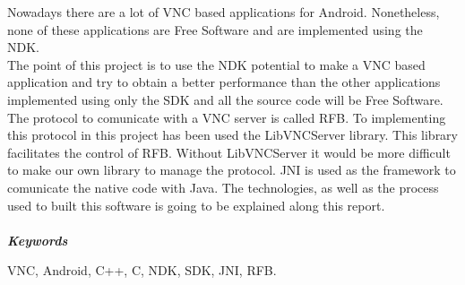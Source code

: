 
Nowadays there are a lot of VNC based applications for Android. Nonetheless, none of these applications are Free Software and are implemented using the NDK.\\

The point of this project is to use the NDK potential to make a VNC based application and try to obtain a better performance than the other applications implemented using only the SDK and all the source code will be Free Software.\\

The protocol to comunicate with a VNC server is called RFB. To implementing this protocol in this project has been used the LibVNCServer library. This library facilitates the control of RFB. Without LibVNCServer it would be more difficult to make our own library to manage the protocol. JNI is used as the framework to comunicate the native code with Java. The technologies, as well as the process used to built this software is going to be explained along this report. 
\\ \mbox{ } \\
\textit{\textbf{Keywords}}

VNC, Android, C++, C, NDK, SDK, JNI, RFB.
